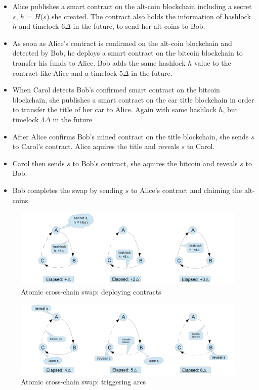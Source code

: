 \begin{itemize}
	\item Alice publishes a smart contract on the alt-coin blockchain including a secret $s$, $h$ = $H$($s$) she created. The contract also holds the information of hashlock $h$ and timelock 6$\Delta$ in the future, to send her alt-coins to Bob.
	\item As soon as Alice's contract is confirmed on the alt-coin blockchain and detected by Bob, he deploys a smart contract on the bitcoin blockchain to transfer his funds to Alice. Bob adds the same hashlock $h$ value to the contract like Alice and a timelock 5$\Delta$ in the future.
	\item When Carol detects Bob's confirmed smart contract on the bitcoin blockchain, she publishes a smart contract on the car title blockchain in order to transfer the title of her car to Alice. Again with same hashlock $h$, but timelock 4$\Delta$ in the future
	\item After Alice confirms Bob's mined contract on the title blockchain, she sends $s$ to Carol's contract. Alice aquires the title and reveals $s$ to Carol.
	\item Carol then sends $s$ to Bob's contract, she aquires the bitcoin and reveals $s$ to Bob.
	\item Bob completes the swap by sending $s$ to Alice's contract and claiming the alt-coins.
\end{itemize}

\begin{figure}[h]
	\includegraphics[width=16cm]{deploying_contracts}	%
	\caption{Atomic cross-chain swap: deploying contracts}
	\label{fig:deploying_contracts}
\end{figure}

\clearpage

\begin{figure}[h]
	\includegraphics[width=0.8\paperwidth]{triggering_arcs}	%
	\caption{Atomic cross-chain swap: triggering arcs}
	\label{fig:triggering_arcs}
\end{figure}


